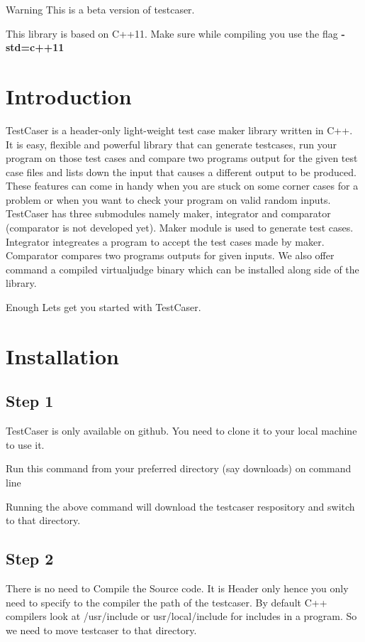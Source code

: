 \begin{DoxyWarning}{Warning}
This is a beta version of testcaser.

This library is based on C++11. Make sure while compiling you use the flag {\bfseries{-\/std=c++11}}
\end{DoxyWarning}
\hypertarget{index_sec_intro}{}\section{Introduction}\label{index_sec_intro}
Test\+Caser is a header-\/only light-\/weight test case maker library written in C++. It is easy, flexible and powerful library that can generate testcases, run your program on those test cases and compare two program\textquotesingle{}s output for the given test case files and lists down the input that causes a different output to be produced. These features can come in handy when you are stuck on some corner cases for a problem or when you want to check your program on valid random inputs. Test\+Caser has three submodules namely maker, integrator and comparator (comparator is not developed yet). Maker module is used to generate test cases. Integrator integreates a program to accept the test cases made by maker. Comparator compares two program\textquotesingle{}s outputs for given inputs. We also offer command a compiled virtualjudge binary which can be installed along side of the library.

Enough Let\textquotesingle{}s get you started with Test\+Caser. 

\hypertarget{index_sec_install}{}\section{Installation}\label{index_sec_install}
\hypertarget{index_step1}{}\subsection{Step 1}\label{index_step1}
Test\+Caser is only available on github. You need to clone it to your local machine to use it.

Run this command from your preferred directory (say downloads) on command line 
\begin{DoxyCode}{0}
\end{DoxyCode}
 Running the above command will download the testcaser respository and switch to that directory.\hypertarget{index_step2}{}\subsection{Step 2}\label{index_step2}
There is no need to Compile the Source code. It is Header only hence you only need to specify to the compiler the path of the testcaser. By default C++ compilers look at {\ttfamily /usr/include} or {\ttfamily usr/local/include} for includes in a program. So we need to move testcaser to that directory.


